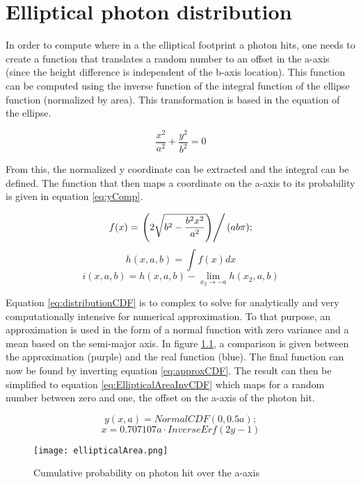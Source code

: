 \chapter{Elliptical photon distribution}
\label{EllipticalPhotonDistribution}

In order to compute where in a the elliptical footprint a photon hits, one needs to create a function that translates a random number to an offset in the a-axis (since the height difference is independent of the b-axis location). This function can be computed using the inverse function of the integral function of the ellipse function (normalized by area). This transformation is based in the equation of the ellipse.

\begin{equation}
	\frac{x^2}{a^2}+\frac{y^2}{b^2}=0
\end{equation}

From this, the normalized y coordinate can be extracted and the integral can be defined. The function that then maps a coordinate on the a-axis to its probability is given in equation \ref{eq:yComp}.


\begin{equation}
	f(x) = \left. \left(2 \sqrt{b^2-\frac{b^2 x^2}{a^2}}\right)\right/(a b \pi);
	\label{eq:yComp}
\end{equation}
\begin{equation}
	h(x,a,b) = \int f(x) dx
\end{equation}
\begin{equation}
	i(x,a,b) = h(x,a,b)-\lim_{x_2\to-a} h(x_2,a,b)
	\label{eq:distributionCDF}
\end{equation}

Equation \ref{eq:distributionCDF} is to complex to solve for analytically and very computationally intensive for numerical approximation. To that purpose, an approximation is used in the form of a normal function with zero variance and a mean based on the semi-major axis. In figure \ref{fig:CDFcomparison}, a comparison is given between the approximation (purple) and the real function (blue). The final function can now be found by inverting equation \ref{eq:approxCDF}. The result can then be simplified to equation \ref{eq:EllipticalAreaInvCDF} which maps for a random number between zero and one, the offset on the a-axis of the photon hit.

\begin{equation}
	y(x,a) = NormalCDF(0, 0.5a);
	\label{eq:approxCDF}
\end{equation}
\begin{equation}
	x = 0.707107 a \cdot InverseErf(2y-1)
	\label{eq:EllipticalAreaInvCDF}
\end{equation}

\begin{figure}[ht]
	\centering
	\texttt{[image: ellipticalArea.png]}%
		\caption{Cumulative probability on photon hit over the a-axis}%
		\label{fig:CDFcomparison}
\end{figure}